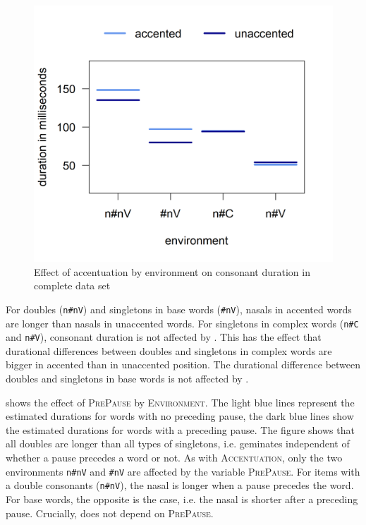 \begin{figure}
	
	\includegraphics [scale=0.5] {images/Experiment/unModelCompleteInterEnvAcc}
	
	\caption{Effect of accentuation by environment on consonant duration in complete data set}
	\label{fig:NumNasal Acc un experiment}
\end{figure}


 For  doubles (\texttt{n\#nV}) and singletons in base words (\texttt{\#nV}), nasals in accented words are longer than nasals in unaccented words.
For singletons in complex words (\texttt{n\#C} and \texttt{n\#V}), consonant duration is not affected by . This has the effect that durational differences between doubles and singletons in complex words are bigger in accented than in unaccented position. The durational difference between doubles and singletons in base words is not affected by .







 shows the effect of \textsc{PrePause} by \textsc{Environment}. The light blue lines represent the estimated durations for words with no preceding pause, the dark blue lines show the estimated durations for words with a preceding pause. 
The figure shows that all doubles are longer than all types of singletons, i.e.  geminates independent of whether a pause precedes a word or not.
As with \textsc{Accentuation}, only the two environments \texttt{n\#nV} and \texttt{\#nV} are affected by the variable \textsc{PrePause}. For items with a double consonants (\texttt{n\#nV}), the nasal is longer when a pause precedes the word. For base words, the opposite is the case, i.e. the nasal is shorter after a preceding pause.
Crucially,  does not depend on \textsc{PrePause}. 

